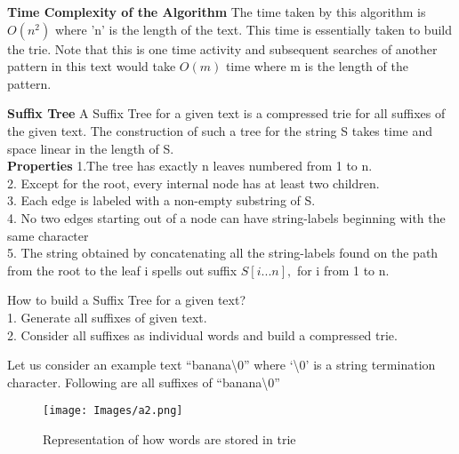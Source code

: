\documentclass[11pt,a4paper]{article}
\begin{document}
\textbf{Time Complexity of the Algorithm}
The time taken by this algorithm is \begin{math}O(n^2)\end{math} where 'n' is the length of the text. This time is essentially taken to build the trie. Note that this is one time activity and subsequent searches of another pattern in this text would take \begin{math} O(m) \end{math} time where m is the length of the pattern. \vspace{0.8 cm}

\textbf{Suffix Tree}
A Suffix Tree for a given text is a compressed trie for all suffixes of the given text. The construction of such a tree for the string S takes time and space linear in the length of S.
\\

\textbf{Properties}
1.The tree has exactly n leaves numbered from 1 to n.
\\
2. Except for the root, every internal node has at least two children.
\\
3. Each edge is labeled with a non-empty substring of S.
\\
4. No two edges starting out of a node can have string-labels beginning with the same character
\\
5. The string obtained by concatenating all the string-labels found on the path from the root to the leaf i spells out suffix \begin{math} S[i... n],\end{math} for i from 1 to n. \vspace{0.5cm}

How to build a Suffix Tree for a given text? 
\\
1. Generate all suffixes of given text.
\\
2. Consider all suffixes as individual words and build a compressed trie.\vspace{0.4cm}

Let us consider an example text  “banana\textbackslash0” where ‘\textbackslash0’ is a string termination character. Following are all suffixes of “banana\textbackslash0” \vspace{0.4cm}

\begin{figure}[H]
    \centering
    \texttt{[image: Images/a2.png]}
    \caption{Representation of how words are stored in trie}
    \label{fig:StoringExample}
\end{figure} \vspace{3cm}
\end{document}
